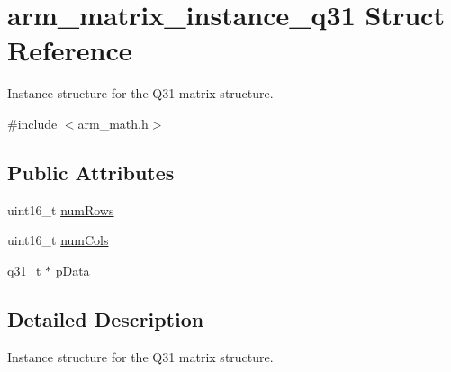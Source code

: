 \hypertarget{structarm__matrix__instance__q31}{\section{arm\-\_\-matrix\-\_\-instance\-\_\-q31 Struct Reference}
\label{structarm__matrix__instance__q31}
}


Instance structure for the Q31 matrix structure.  




{\ttfamily \#include $<$arm\-\_\-math.\-h$>$}

\subsection*{Public Attributes}
\begin{DoxyCompactItemize}
\item 
uint16\-\_\-t \hyperlink{structarm__matrix__instance__q31_a63bacac158a821c8cfc06088d251598c}{num\-Rows}
\item 
uint16\-\_\-t \hyperlink{structarm__matrix__instance__q31_abd161da7614eda927157f18b698074b1}{num\-Cols}
\item 
q31\-\_\-t $\ast$ \hyperlink{structarm__matrix__instance__q31_a09a64267c0579fef086efc9059741e56}{p\-Data}
\end{DoxyCompactItemize}


\subsection{Detailed Description}
Instance structure for the Q31 matrix structure. 

